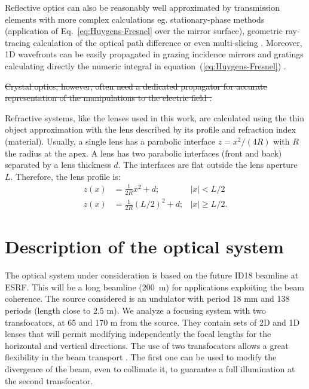 \documentclass{iucr}              %
\newcommand{\remove}[1]{ {\color{blue} \sout{#1}}}
\newcommand{\inblue}[1]{{\color{blue}#1}}
\begin{document}
Reflective optics can also be reasonably well approximated by transmission elements with more complex calculations eg. stationary-phase methods (application of Eq.~\ref{eq:Huygens-Fresnel} over the mirror surface), geometric ray-tracing calculation of the optical path difference \cite{Canestrari2014} or even multi-slicing \cite{Li2017}. 
\inblue{Moreover, 1D wavefronts can be easily propagated in grazing incidence mirrors and gratings calculating directly the numeric integral in equation~(\ref{eq:Huygens-Fresnel}) \cite{wiser2015,srioLBL}. }

\remove{Crystal optics, however, often need a dedicated propagator for accurate representation of the manipulations to the electric field \cite{Sutter2014, Sutter2020}.}

\inblue{Refractive systems, like the lenses used in this work, are calculated using the thin object approximation with the lens described by its profile and refraction index (material). Usually, a single lens has a parabolic interface $z=x^2/(4R)$ with $R$ the radius at the apex. A lens has two parabolic interfaces (front and back) separated by a lens thickness $d$. The interfaces are flat outside the lens aperture $L$. Therefore, the lens profile is:
\begin{align}
    z(x) &= \frac{1}{2R} x^2 + d; & |x| < L/2\\ \nonumber
    z(x) &= \frac{1}{2R} (L/2)^2 + d; & |x| \ge L/2.
\end{align}
}

\section{Description of the optical system}
\label{sec:beamline}

The optical system under consideration is based on the future ID18 beamline at ESRF. This will be a long beamline (200~m) for applications exploiting the beam coherence. The source considered is an undulator with period 18 mm and 138 periods (length close to 2.5 m).  
We analyze a focusing system with two transfocators, at 65 and 170 m from the source. They contain sets of 2D and 1D lenses that will permit modifying independently the focal lengths for the horizontal and vertical directions. The use of two transfocators allows a great flexibility in the beam transport \cite{Vaughan:kv5084}. The first one can be used to modify the divergence of the beam, even to collimate it, to guarantee a full illumination at the second transfocator.  
\end{document}
